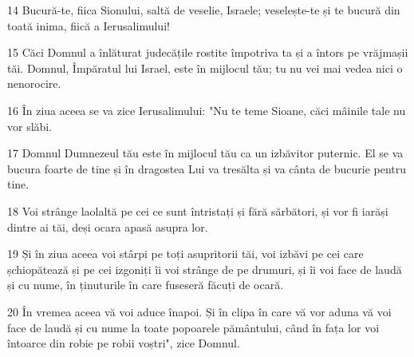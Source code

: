 \par 14 Bucură-te, fiica Sionului, saltă de veselie, Israele; veselește-te și te bucură din toată inima, fiică a Ierusalimului!
\par 15 Căci Domnul a înlăturat judecățile rostite împotriva ta și a întors pe vrăjmașii tăi. Domnul, Împăratul lui Israel, este în mijlocul tău; tu nu vei mai vedea nici o nenorocire.
\par 16 În ziua aceea se va zice Ierusalimului: "Nu te teme Sioane, căci mâinile tale nu vor slăbi.
\par 17 Domnul Dumnezeul tău este în mijlocul tău ca un izbăvitor puternic. El se va bucura foarte de tine și în dragostea Lui va tresălta și va cânta de bucurie pentru tine.
\par 18 Voi strânge laolaltă pe cei ce sunt întristați și fără sărbători, și vor fi iarăși dintre ai tăi, deși ocara apasă asupra lor.
\par 19 Și în ziua aceea voi stârpi pe toți asupritorii tăi, voi izbăvi pe cei care șchiopătează și pe cei izgoniți îi voi strânge de pe drumuri, și îi voi face de laudă și cu nume, în ținuturile în care fuseseră făcuți de ocară.
\par 20 În vremea aceea vă voi aduce înapoi. Și în clipa în care vă vor aduna vă voi face de laudă și cu nume la toate popoarele pământului, când în fața lor voi întoarce din robie pe robii voștri", zice Domnul.


